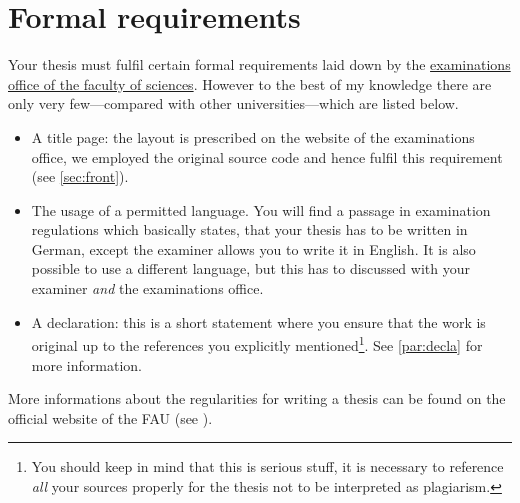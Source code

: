 \section{Formal requirements}\label{sec:reg}
Your thesis must fulfil certain formal requirements laid down by the 
\hyperlink{
https://www.fau.eu/education/advice-and-services/examination-offices/
examinations-office-faculty-of-sciences}{examinations office of the faculty of sciences}. 
However to the best of my knowledge there are only very few---compared with other 
universities---which are listed below.
\begin{itemize}
\item A title page: the layout is prescribed on the website of the examinations office, we 
employed the original source code and hence fulfil this requirement (see \cref{sec:front}). 
\item The usage of a permitted language. You will find a passage in 
examination regulations which basically states, that your thesis has to be written in 
German, except the examiner allows you to write it in English. It is also possible to 
use a different language, but this has to discussed with your examiner \emph{and} 
the examinations office.
\item A declaration: this is a short statement where you ensure that the work is original 
up to the references you explicitly mentioned\footnote{You should keep in mind that this 
is serious stuff, it is necessary to reference \emph{all} your sources properly for the 
thesis not to be interpreted as plagiarism.}. See \cref{par:decla} for more information.
\end{itemize}
More informations about the regularities for writing a thesis can be found on the official 
website of the FAU (see \cite{FAUreg}).
